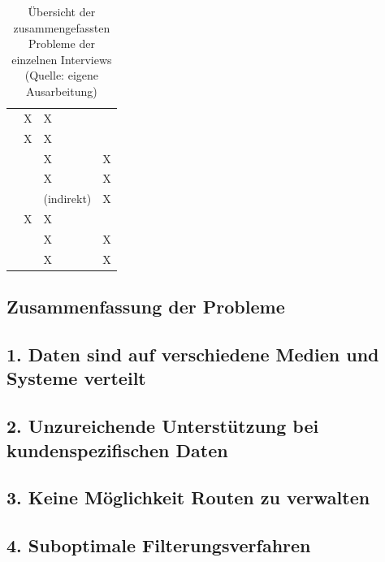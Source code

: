 \documentclass[Bachelorarbeit.tex]{subfiles}
\begin{document}
\def\arraystretch{1.5} %
\begin{table}[h]
	\begin{tabular}{|p{5cm}|p{}|p{}|p{}|}
		\hline  
		& \ctab \nameref{anhang:interview1} 
		& \ctab \nameref{anhang:interview2} 
		& \ctab \nameref{anhang:interview3} \\ 
		\hline 
		\nameref{p1}
		& \ctab X
		& \ctab X
		& \ctab  \\ 
		\hline 
		\nameref{p2}
		& \ctab  X
		& \ctab X
		& \ctab  \\ 
		
		\hline 
		\nameref{p3}
		& \ctab  
		& \ctab X
		& \ctab X \\ 
		\hline 
		\nameref{p4}
		& \ctab 
		& \ctab  X
		& \ctab X \\ 
		\hline 
		\nameref{p5}
		& \ctab 
		& \ctab (indirekt)
		& \ctab X \\ 
		\hline 
		\nameref{p6}
		& \ctab X
		& \ctab X
		& \ctab  \\ 
		\hline 
		\nameref{p7}
		& \ctab 
		& \ctab X
		& \ctab X \\
		\hline 
		\nameref{p8}
		& \ctab
		& \ctab X
		& \ctab X \\
		\hline 
	\end{tabular} 
	\caption[Zusammenfassung der Probleme]{Übersicht der zusammengefassten Probleme der einzelnen Interviews (Quelle: eigene Ausarbeitung)}
	\label{tab:problemeInterviews}
\end{table}

\subsection*{Zusammenfassung der Probleme}
\subsection*{1. Daten sind auf verschiedene Medien und Systeme verteilt}
\label{p1}
\subsection*{2. Unzureichende Unterstützung bei kundenspezifischen Daten}
\label{p2}
\subsection*{3. Keine Möglichkeit Routen zu verwalten}
\label{p3}
\subsection*{4. Suboptimale Filterungsverfahren}
\label{p4}
\end{document}
